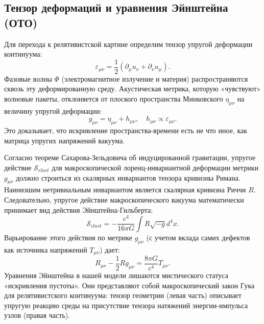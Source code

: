 \documentclass[12pt,a4paper]{article}
\begin{document}
\subsection{Тензор деформаций и уравнения Эйнштейна (ОТО)}
Для перехода к релятивистской картине определим тензор упругой деформации континуума:
\begin{equation}
	\varepsilon_{\mu\nu} = \frac{1}{2} (\partial_\mu u_\nu + \partial_\nu u_\mu).
\end{equation}
Фазовые волны $\Phi$ (электромагнитное излучение и материя) распространяются сквозь эту деформированную среду. Акустическая метрика, которую «чувствуют» волновые пакеты, отклоняется от плоского пространства Минковского $\eta_{\mu\nu}$ на величину упругой деформации:
\begin{equation}
	g_{\mu\nu} = \eta_{\mu\nu} + h_{\mu\nu}, \quad h_{\mu\nu} \propto \varepsilon_{\mu\nu}.
\end{equation}
Это доказывает, что искривление пространства-времени есть не что иное, как матрица упругих напряжений вакуума. 

Согласно теореме Сахарова-Зельдовича об индуцированной гравитации, упругое действие $\mathcal{S}_{elast}$ для макроскопической лоренц-инвариантной деформации метрики $g_{\mu\nu}$ должно строиться из скалярных инвариантов тензора кривизны Римана. Наинизшим нетривиальным инвариантом является скалярная кривизна Риччи $R$. Следовательно, упругое действие макроскопического вакуума математически принимает вид действия Эйнштейна-Гильберта:
\begin{equation}
	\mathcal{S}_{elast} = -\frac{c^4}{16\pi G} \int R \sqrt{-g} d^4x.
\end{equation}
Варьирование этого действия по метрике $g_{\mu\nu}$ (с учетом вклада самих дефектов как источника напряжений $T_{\mu\nu}$) дает:
\begin{equation}
	R_{\mu\nu} - \frac{1}{2}R g_{\mu\nu} = \frac{8\pi G}{c^4} T_{\mu\nu}.
\end{equation}
Уравнения Эйнштейна в нашей модели лишаются мистического статуса «искривления пустоты». Они представляют собой макроскопический закон Гука для релятивистского континуума: тензор геометрии (левая часть) описывает упругую реакцию среды на присутствие тензора натяжений энергии-импульса узлов (правая часть).
\end{document}
